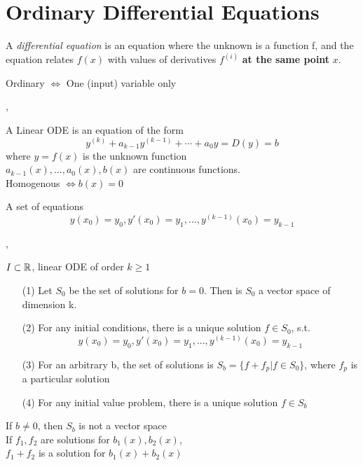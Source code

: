 \part{Ordinary Differential Equations}
\setcounter{section}{0}

\Def A \textit{differential equation} is an equation where the unknown is a function f, and the equation relates $f(x)$ with values of derivatives $f^{(i)}$ \textbf{at the same point} $x$.

\Def Ordinary $\iff$ One (input) variable only

\sep

\Def A Linear ODE is an equation of the form
\[ y^{(k)} + a_{k - 1} y^{(k - 1)} + \cdots + a_0 y = D(y) = b \] 
where $y = f(x)$ is the unknown function \\
$a_{k - 1}(x), ..., a_0(x), b(x)$ are continuous functions. \\

\Def Homogenous $ \iff b(x) = 0$ 

 A set of equations
\[y(x_0) = y_0, y'(x_0) = y_1, ..., y^{(k - 1)}(x_0) = y_{k - 1} \]

\sep

\Theorem[2.2.3] $I \subset \mathbb{R}$,  linear ODE of order $k \geq 1$
\begin{enumerate}
\item[(1)] Let $S_0$ be the set of solutions for $b = 0$. Then is $S_0$ a vector space of dimension k.
\item[(2)] For any initial conditions, there is a unique solution $f \in S_0$, s.t.
\[y(x_0) = y_0, y'(x_0) = y_1, ..., y^{(k - 1)}(x_0) = y_{k - 1} \]

\item[(3)] For an arbitrary b, the set of solutions is $S_b = \{f + f_p | f \in S_0\}$, where $f_p$ is a particular solution
\item[(4)] For any initial value problem, there is a unique solution $f \in S_b$
\end{enumerate}
\Bem If $b \neq 0$, then $S_b$ is not a vector space \\
\Bem If $f_1, f_2$ are solutions for $b_1(x), b_2(x)$, \\ $f_1 + f_2$ is a solution for $b_1(x) + b_2(x)$




